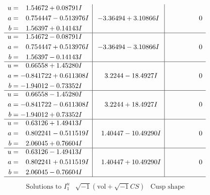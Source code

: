 \documentclass[1p]{elsarticle_modified}
\theoremstyle{definition}
\newcommand{\I}{\sqrt{-1}}
\begin{document}
$$\begin{array}{c|c|c}
\begin{aligned}
u &= \phantom{-}1.54672 + 0.08791 I \\
a &= \phantom{-}0.754447 - 0.513976 I \\
b &= \phantom{-}1.56397 + 0.14143 I\end{aligned}
 & -3.36494 + 3.10866 I & \phantom{-0.000000 } 0 \\ \hline\begin{aligned}
u &= \phantom{-}1.54672 - 0.08791 I \\
a &= \phantom{-}0.754447 + 0.513976 I \\
b &= \phantom{-}1.56397 - 0.14143 I\end{aligned}
 & -3.36494 - 3.10866 I & \phantom{-0.000000 } 0 \\ \hline\begin{aligned}
u &= \phantom{-}0.66558 + 1.45280 I \\
a &= -0.841722 + 0.611308 I \\
b &= -1.94012 - 0.73352 I\end{aligned}
 & \phantom{-}3.2244 - 18.4927 I & \phantom{-0.000000 } 0 \\ \hline\begin{aligned}
u &= \phantom{-}0.66558 - 1.45280 I \\
a &= -0.841722 - 0.611308 I \\
b &= -1.94012 + 0.73352 I\end{aligned}
 & \phantom{-}3.2244 + 18.4927 I & \phantom{-0.000000 } 0 \\ \hline\begin{aligned}
u &= \phantom{-}0.63126 + 1.49413 I \\
a &= \phantom{-}0.802241 - 0.511519 I \\
b &= \phantom{-}2.06045 + 0.76604 I\end{aligned}
 & \phantom{-}1.40447 - 10.49290 I & \phantom{-0.000000 } 0 \\ \hline\begin{aligned}
u &= \phantom{-}0.63126 - 1.49413 I \\
a &= \phantom{-}0.802241 + 0.511519 I \\
b &= \phantom{-}2.06045 - 0.76604 I\end{aligned}
 & \phantom{-}1.40447 + 10.49290 I & \phantom{-0.000000 } 0\\
 \hline 
 \end{array}$$\newpage$$\begin{array}{c|c|c}  
\text{Solutions to }I^u_{1}& \I (\text{vol} + \sqrt{-1}CS) & \text{Cusp shape}\\

\end{array}$$
\end{document}
